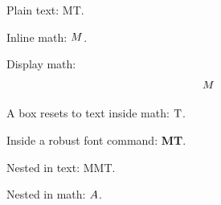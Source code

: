 \documentclass{article}
\begin{document}

Plain text: \ifmmode M\else T\fi.

Inline math: $\ifmmode M\else T\fi$.

Display math: \[\ifmmode M\else T\fi\]

A box resets to text inside math: $\mbox{\ifmmode M\else T\fi}$.

Inside a robust font command: \textbf{\ifmmode M\else T\fi}.

Nested in text: \ifmmode M\else\ifmmode M\else T\fi\fi.

Nested in math: $\ifmmode\ifmmode A\else B\fi\else C\fi$.
\end{document}
